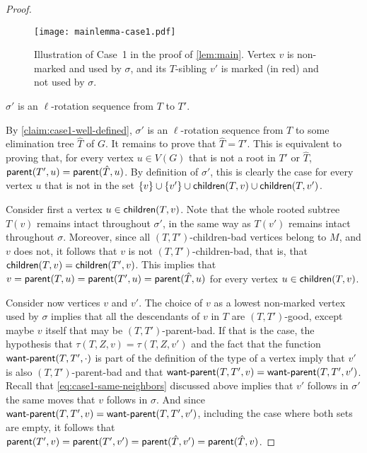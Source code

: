 \documentclass[a4paper,UKenglish,cleveref, autoref, thm-restate]{lipics-v2021}
\newenvironment{cproof}{\proof[Proof of claim]\renewcommand\qedsymbol{$\diamond$}}{\endproof}
\newcommand{\parent}{{\sf parent}\xspace}
\newcommand{\child}{{\sf children}\xspace}
\newcommand{\wantparent}{{\sf {\sf want{\text -}parent}}\xspace}
\begin{document}
\begin{proof}
\begin{figure}[h!tb]
    \centering
    \vspace{-.3cm}
    \texttt{[image: mainlemma-case1.pdf]}
    \caption{Illustration of Case~1 in the proof of  \autoref{lem:main}. Vertex $v$ is non-marked and used by $\sigma$, and its $T$-sibling $v'$ is marked (in red) and not used by $\sigma$.\label{fig:mainlemma-case1}}
\end{figure}



\begin{claim}\label{claim:case1-good-rotation-sequence}
$\sigma'$ is an $\ell$-rotation sequence from $T$ to $T'$.
\end{claim}
\begin{cproof}
By \autoref{claim:case1-well-defined}, $\sigma'$ is an $\ell$-rotation sequence from $T$ to some elimination tree $\hat{T}$ of $G$. It remains to prove that $\hat{T}=T'$. This is equivalent to proving that, for every vertex $u \in V(G)$ that is not a root in $T'$ or $\hat{T}$, $\parent(T',u) = \parent(\hat{T},u)$. By definition of $\sigma'$, this is clearly the case for every vertex $u$ that is not in the set $\{v\}\cup \{v'\} \cup \child(T,v) \cup \child(T,v')$.


Consider first a vertex $u \in \child(T,v)$. Note that the whole rooted subtree $T(v)$ remains intact throughout $\sigma'$, in the same way as $T(v')$ remains intact throughout $\sigma$. Moreover, since all $(T,T')$-children-bad vertices belong to $M$, and $v$ does not, it follows that $v$ is not $(T,T')$-children-bad, that is, that $\child(T,v)=\child(T',v)$. This implies that $v =  \parent(T,u) = \parent(T',u) = \parent(\hat{T},u)$ for every vertex $u \in \child(T,v)$.


Consider now vertices $v$ and $v'$. The choice of $v$ as a lowest non-marked vertex used by $\sigma$ implies that all the descendants of $v$ in $T$ are $(T,T')$-good, except maybe $v$ itself that may be $(T,T')$-parent-bad. If that is the case, the hypothesis that $\tau(T,Z,v)=\tau(T,Z,v')$ and the fact that the function $\wantparent(T,T',\cdot)$ is part of the definition of the type of a vertex imply that $v'$ is also $(T,T')$-parent-bad and that $\wantparent(T,T',v) = \wantparent(T,T',v')$.  Recall that \autoref{eq:case1-same-neighbors} discussed above implies that
$v'$ follows in $\sigma'$ the same moves that $v$ follows in $\sigma$. And since $\wantparent(T,T',v) = \wantparent(T,T',v')$, including the case where both sets are empty, it follows that $\parent(T',v) = \parent(T',v') = \parent(\hat{T},v')=\parent(\hat{T},v)$.


\end{cproof}
\end{proof}
\end{document}
